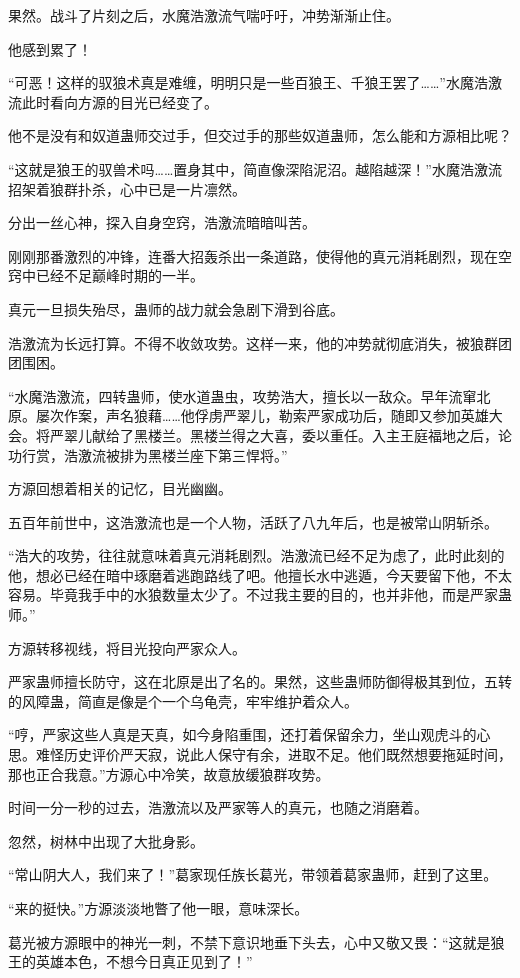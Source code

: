 \begin{this_body}
果然。战斗了片刻之后，水魔浩激流气喘吁吁，冲势渐渐止住。

他感到累了！

“可恶！这样的驭狼术真是难缠，明明只是一些百狼王、千狼王罢了……”水魔浩激流此时看向方源的目光已经变了。

他不是没有和奴道蛊师交过手，但交过手的那些奴道蛊师，怎么能和方源相比呢？

“这就是狼王的驭兽术吗……置身其中，简直像深陷泥沼。越陷越深！”水魔浩激流招架着狼群扑杀，心中已是一片凛然。

分出一丝心神，探入自身空窍，浩激流暗暗叫苦。

刚刚那番激烈的冲锋，连番大招轰杀出一条道路，使得他的真元消耗剧烈，现在空窍中已经不足巅峰时期的一半。

真元一旦损失殆尽，蛊师的战力就会急剧下滑到谷底。

浩激流为长远打算。不得不收敛攻势。这样一来，他的冲势就彻底消失，被狼群团团围困。

“水魔浩激流，四转蛊师，使水道蛊虫，攻势浩大，擅长以一敌众。早年流窜北原。屡次作案，声名狼藉……他俘虏严翠儿，勒索严家成功后，随即又参加英雄大会。将严翠儿献给了黑楼兰。黑楼兰得之大喜，委以重任。入主王庭福地之后，论功行赏，浩激流被排为黑楼兰座下第三悍将。”

方源回想着相关的记忆，目光幽幽。

五百年前世中，这浩激流也是一个人物，活跃了八九年后，也是被常山阴斩杀。

“浩大的攻势，往往就意味着真元消耗剧烈。浩激流已经不足为虑了，此时此刻的他，想必已经在暗中琢磨着逃跑路线了吧。他擅长水中逃遁，今天要留下他，不太容易。毕竟我手中的水狼数量太少了。不过我主要的目的，也并非他，而是严家蛊师。”

方源转移视线，将目光投向严家众人。

严家蛊师擅长防守，这在北原是出了名的。果然，这些蛊师防御得极其到位，五转的风障蛊，简直是像是个一个乌龟壳，牢牢维护着众人。

“哼，严家这些人真是天真，如今身陷重围，还打着保留余力，坐山观虎斗的心思。难怪历史评价严天寂，说此人保守有余，进取不足。他们既然想要拖延时间，那也正合我意。”方源心中冷笑，故意放缓狼群攻势。

时间一分一秒的过去，浩激流以及严家等人的真元，也随之消磨着。

忽然，树林中出现了大批身影。

“常山阴大人，我们来了！”葛家现任族长葛光，带领着葛家蛊师，赶到了这里。

“来的挺快。”方源淡淡地瞥了他一眼，意味深长。

葛光被方源眼中的神光一刺，不禁下意识地垂下头去，心中又敬又畏：“这就是狼王的英雄本色，不想今日真正见到了！”


\end{this_body}
